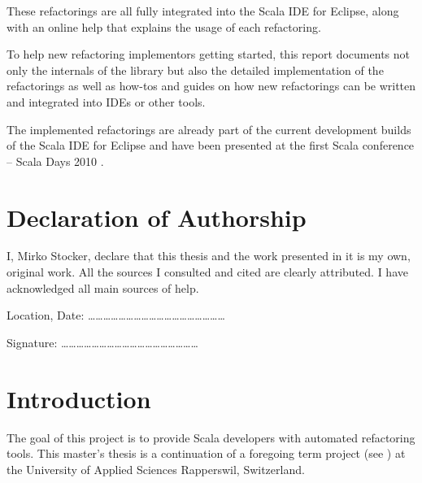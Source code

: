 \documentclass[10pt,a4paper,oneside]{scrreprt}
\begin{document}
These refactorings are all fully integrated into the Scala IDE for Eclipse, along with an online help that explains the usage of each refactoring.

To help new refactoring implementors getting started, this report documents not only the internals of the library but also the detailed implementation of the refactorings as well as how-tos and guides on how new refactorings can be written and integrated into IDEs or other tools.

The implemented refactorings are already part of the current development builds of the Scala IDE for Eclipse and have been presented at the first Scala conference -- Scala Days 2010 \cite{ScalaDaysRefactoring}.

\newpage

\chapter*{Declaration of Authorship}

I, Mirko Stocker, declare that this thesis and the work presented in it is my own, original work. All the sources I consulted and cited are clearly attributed. I have acknowledged all main sources of help.

\vspace{3cm}

\noindent Location, Date: \hspace{1cm} \ldots\ldots\ldots\ldots\ldots\ldots\ldots\ldots\ldots\ldots\ldots\ldots\ldots\ldots\ldots\ldots\ldots\ldots \\

\vspace{1.5cm}

\noindent Signature: \hspace{1.77cm} \ldots\ldots\ldots\ldots\ldots\ldots\ldots\ldots\ldots\ldots\ldots\ldots\ldots\ldots\ldots\ldots\ldots\ldots

\newpage

\setcounter{tocdepth}{2}

\tableofcontents

\newpage


\chapter{Introduction} \label{chapter:introduction}

The goal of this project is to provide Scala developers with automated refactoring tools. This master's thesis is a continuation of a foregoing term project (see \cite{ScalaRefactoring}) at the University of Applied Sciences Rapperswil, Switzerland. 
\end{document}
